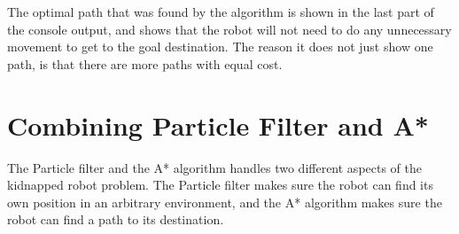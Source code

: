 The optimal path that was found by the algorithm is shown in the last part of the console output, and shows that the robot will not need to do any unnecessary movement to get to the goal destination. The reason it does not just show one path, is that there are more paths with equal cost.  



\section{Combining Particle Filter and A*}

The Particle filter and the A* algorithm handles two different aspects of the kidnapped robot problem. The Particle filter makes sure the robot can find its own position in an arbitrary environment, and the A* algorithm makes sure the robot can find a path to its destination.